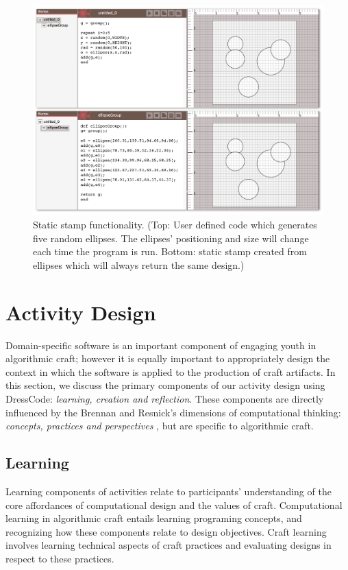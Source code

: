 \documentclass{sigchi}
\begin{document}
\begin{center}
\begin{figure}[h!]
\includegraphics[width=\columnwidth]{images/stamps.jpg}
\caption{Static stamp functionality. (Top: User defined code which generates five random ellipses. The ellipses' positioning and size will change each time the program is run. Bottom: static stamp created from ellipses which will always return the same design.)}
\label{fig:stamps}
\end{figure}
\end{center}

\section{Activity Design}
Domain-specific software is an important component of engaging youth in algorithmic craft; however it is equally important to appropriately design the context in which the software is applied to the production of craft artifacts. In this section, we discuss the primary components of our activity design using DressCode: \emph{learning, creation and reflection}. These components are directly influenced by the Brennan and Resnick's dimensions of computational thinking: \emph{concepts, practices and perspectives} \cite{computational_thinking}, but are specific to algorithmic craft.

\subsection{Learning}
Learning components of activities relate to participants' understanding of the core affordances of computational design and the values of craft. Computational learning in algorithmic craft entails learning programing concepts, and recognizing how these components relate to design objectives. Craft learning involves learning technical aspects of craft practices and evaluating designs in respect to these practices.
\end{document}
